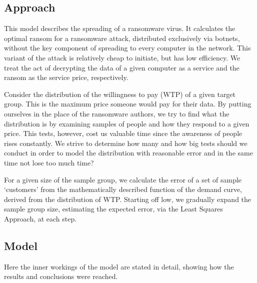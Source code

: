 \documentclass[11pt, a4paper]{article}
\theoremstyle{definition}
\begin{document}
		\subsection{Approach}
			This model describes the spreading of a ransomware virus. It calculates the optimal ransom for a ransomware attack, distributed exclusively via botnets, without the key component of spreading to every computer in the network. This variant of the attack is relatively cheap to initiate, but has low efficiency.	We treat the act of decrypting the data of a given computer as a service and the ransom as the service price, respectively. \par
			Consider the distribution of the willingness to pay (WTP) of a given target group. This is the maximum price someone would pay for their data. By putting ourselves in the place of the ransomware authors, we try to find what the distribution is by examining samples of people and how they respond to a given price. This tests, however, cost us valuable time since the awareness of people rises constantly. We strive to determine how many and how big tests should we conduct in order to model the distribution with reasonable error and in the same time not lose too much time?\par
			For a given size of the sample group, we calculate the error of a set of sample `customers' from the mathematically described function of the demand curve, derived from the distribution of WTP. Starting off low, we gradually expand the sample group size, estimating the expected error, via the Least Squares Approach, at each step.
	\newpage
		\subsection{Model}
			Here the inner workings of the model are stated in detail, showing how the results and conclusions were reached.
\end{document}
